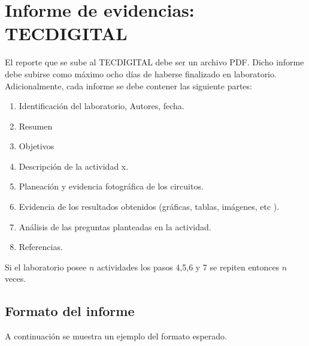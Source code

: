 \documentclass[tocchapterhead=false,10pt,letterpaper]{report}
\begin{document}
	\renewcommand{\thepage}{\roman{page}}
	



\tableofcontents
\newpage
$  $











\appendix

\chapter{Informe de evidencias: TECDIGITAL}


El reporte que se sube al TECDIGITAL debe ser un archivo PDF. Dicho informe debe subirse como máximo ocho días de haberse finalizado en laboratorio. Adicionalmente, cada informe se debe contener las siguiente partes:

\begin{enumerate}
	\item Identificación del laboratorio, Autores, fecha.
	\item Resumen
	\item Objetivos
	\item Descripción de la actividad x.
	\item Planeación y evidencia fotográfica de los circuitos. 
	\item Evidencia de los resultados obtenidos (gráficas, tablas, imágenes, etc ).
	\item Análisis de las preguntas planteadas en la actividad.
	\item Referencias.
\end{enumerate}

Si el laboratorio posee $n$ actividades los pasos 4,5,6 y 7 se repiten entonces $n$ veces. 

\section{Formato del informe}
 A continuación se muestra un ejemplo del formato esperado.
 


\newpage
	
	
\end{document}
